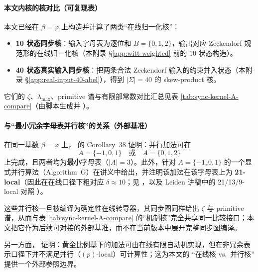 \paragraph{本文内核的核对比（可复现表）}
本文已经在 $\beta=\varphi$ 上构造并计算了两类“在线归一化核”：
\begin{itemize}
  \item \textbf{10 状态同步核}：输入字母表为逐位和 $B=\{0,1,2\}$，输出对应 Zeckendorf 规范形的在线归一化核（本附录 \S\ref{app:witt-weighted} 前的 10 状态构造）。
  \item \textbf{40 状态真实输入同步核}：把两条合法 Zeckendorf 输入的约束并入状态（本附录 \S\ref{app:real-input-40-abel}），得到 $|\Sigma|=40$ 的 skew-product 核。
\end{itemize}
它们的 $\zeta$、$\lambda_{\max}$、primitive 谱与有限部常数对比汇总见表 \ref{tab:sync-kernel-A-compare}（由脚本生成并 \verb||）。


\paragraph{与“最小冗余字母表并行核”的关系（外部基准）}
在同一基数 $\beta=\varphi$ 上，\cite{FrougnyPelantovaSvobodova2013MinimalDigitSets} 的 Corollary~38 证明：并行加法可在
\[
A=\{-1,0,1\}\quad\text{或}\quad A=\{0,1,2\}
\]
上完成，且两者均为\textbf{最小}字母表（$|A|=3$）。此外，针对 $A=\{-1,0,1\}$ 的一个显式并行算法（Algorithm~G）在讲义中给出，并注明该加法在该字母表上为 \textbf{21-local}（因此在在线口径下粗对应 $\delta\approx 10$；见 \cite{FrougnyHellerPelantovaSvobodovaParallelAlgorithmsSlides}，以及 Leiden 讲稿中的 21/13/9-local 对照 \cite{Frougny2012NumbersAsStreamsLeiden}）。

这些并行核一旦被编译为确定性在线转导器，其同步图同样给出 $\zeta$ 与 primitive 谱，从而与表 \ref{tab:sync-kernel-A-compare} 的“机制核”完全共享同一比较接口；本文把它作为后续可对接的外部基准，而不在当前版本中展开完整同步图编译。
\par
另一方面，\cite{Frougny1999OnlineAddition} 证明：黄金比例基下的加法可由在线有限自动机实现，但在非冗余表示口径下并不满足并行（$(p)$-local）可计算性；这为本文的 “在线核 vs.\ 并行核” 提供一个外部参照边界。


